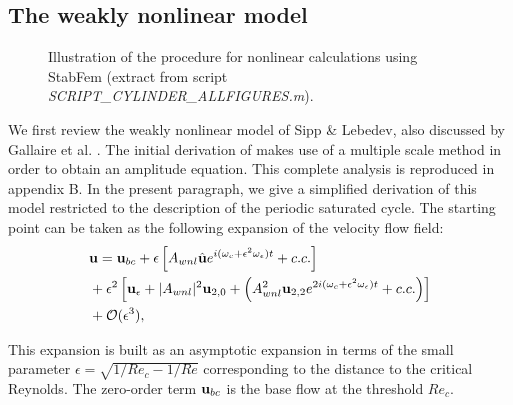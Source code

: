 \documentclass[twocolumn,10pt]{asme2ej}
\newcommand{\be}[1]{ \begin{equation} \label{#1}}
\newcommand{\ee}{\end{equation}}
\begin{document}



\subsection{The weakly nonlinear model}



\begin{figure*}
\small

 \normalsize
\caption{Illustration of the procedure for nonlinear calculations using StabFem (extract from script {{\em SCRIPT\_CYLINDER\_ALLFIGURES.m})}. }
\label{fig:listingNL}
\end{figure*}



We first review the weakly nonlinear model of Sipp \& 
Lebedev\cite{SippLebedev}, also discussed by Gallaire et al. \cite{FDR2016}.  
The initial derivation of \cite{SippLebedev} makes use of a multiple scale method in order to obtain an amplitude equation.
This complete analysis is reproduced in appendix B. In the present paragraph, we give a simplified derivation of this model restricted to the description of the periodic saturated cycle.
The starting point can be taken as the following expansion of the velocity flow field:
\be{WNL1}
\begin{aligned}
&{\bf u} = {}  {\bf u}_{bc} + \epsilon \left[ A_{wnl}  \hat{\bf u} e^{i (\omega_c+\epsilon^2 \omega_\epsilon)  t} + c.c. \right]\\
&+ \epsilon^2 \left[ {\bf u}_\epsilon + |A_{wnl}|^2  {\bf u}_{2,0} + \left(  A_{wnl}^2 {\bf u}_{2,2} e^{2 i(\omega_c+\epsilon^2 \omega_\epsilon)  t} + c.c. \right) \right]\\
& + {\cal O}( \epsilon ^3),
\end{aligned}
\ee



This expansion is built as an asymptotic expansion in terms of the small parameter $\epsilon = \sqrt{1/Re_c - 1/Re}$ corresponding to the distance to the critical Reynolds. 
The zero-order term ${\bf u}_{bc}$ is the base flow at the threshold $Re_c$.
\end{document}
